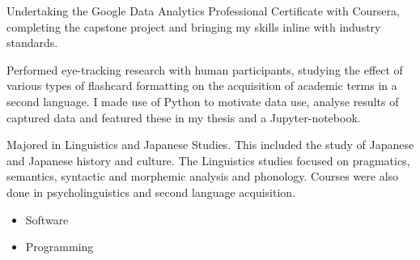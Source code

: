 \documentclass[10pt,a4paper,ragged2e,withhyper]{altacv}
\begin{document}
\begin{paracol}{2}
\label{sec:org1071c84}




{}
\label{sec:orgf5fc90f}
Undertaking the Google Data Analytics Professional Certificate with Coursera, completing the capstone project and bringing my skills inline with industry standards.
\par\divider
{}
Performed eye-tracking research with human participants, studying the effect of
various types of flashcard formatting on the acquisition of academic terms in a
second language. I made use of Python to motivate data use, analyse results of captured data and featured these in my thesis and a Jupyter-notebook.
\par\divider
{}
Majored in Linguistics and Japanese Studies. This included the study of Japanese and Japanese history and culture. The Linguistics studies focused on pragmatics, semantics, syntactic and morphemic analysis and phonology. Courses were also done in psycholinguistics and second language acquisition.

\label{sec:org73ed2cf}
\begin{itemize}
\item Software
\end{itemize}
\begin{itemize}
\item Programming
\end{itemize}
\cvtag{\LaTeX}

\end{paracol}
\end{document}
